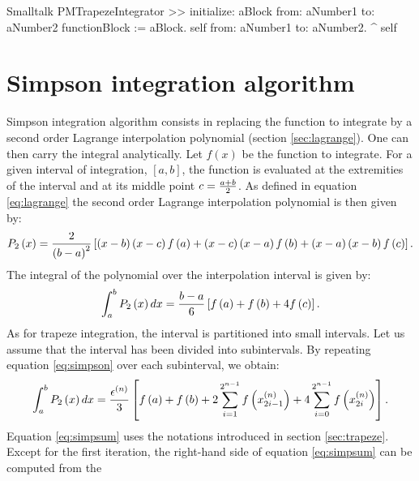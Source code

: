 \begin{displaycode}{Smalltalk}
PMTrapezeIntegrator >> initialize: aBlock from: aNumber1 to: aNumber2
    functionBlock := aBlock.
    self from: aNumber1 to: aNumber2.
    ^ self
\end{displaycode}

\section{Simpson integration algorithm}

Simpson integration algorithm consists in replacing the function to integrate by a second order Lagrange interpolation polynomial\cite{Bass} (\cf section
\ref{sec:lagrange}). One can then carry the integral analytically.
Let $f\left(x\right)$ be the function to integrate. For a given
interval of integration, $\left[a,b\right]$, the function is
evaluated at the extremities of the interval and at its middle
point $c={a+b \over 2}$. As defined in equation \ref{eq:lagrange}
the second order Lagrange interpolation polynomial is then given
by:
\begin{equation}
  P_2\left(x\right)={2\over \left(b-a\right)^2}\left[\left(x-b\right)\left(x-c\right)f\left(a\right) +\left(x-c\right)\left(x-a\right)f\left(b\right) +
  \left(x-a\right)\left(x-b\right)f\left(c\right)\right].
\end{equation}
The integral of the polynomial over the interpolation interval is
given by:
\begin{equation}
\label{eq:simpson} \int_a^b P_2\left(x\right)dx={b-a \over
6}\left[f\left(a\right) + f\left(b\right) + 4 f\left(c\right)
\right].
\end{equation}
As for trapeze integration, the interval is partitioned into small
intervals. Let us assume that the interval has been divided into
subintervals. By repeating equation \ref{eq:simpson} over each
subinterval, we obtain:
\begin{equation}
\label{eq:simpsum} \int_a^b
P_2\left(x\right)dx={\epsilon^{\left(n\right)} \over
3}\left[f\left(a\right) + f\left(b\right) + 2 \sum_{i=1}^{2^{n-1}}
f\left(x_{2i-1}^{\left(n\right)}\right) + 4 \sum_{i=0}^{2^{n-1}}
f\left(x_{2i}^{\left(n\right)}\right) \right].
\end{equation}
Equation \ref{eq:simpsum} uses the notations introduced in section
\ref{sec:trapeze}. Except for the first iteration, the right-hand
side of equation \ref{eq:simpsum} can be computed from the
